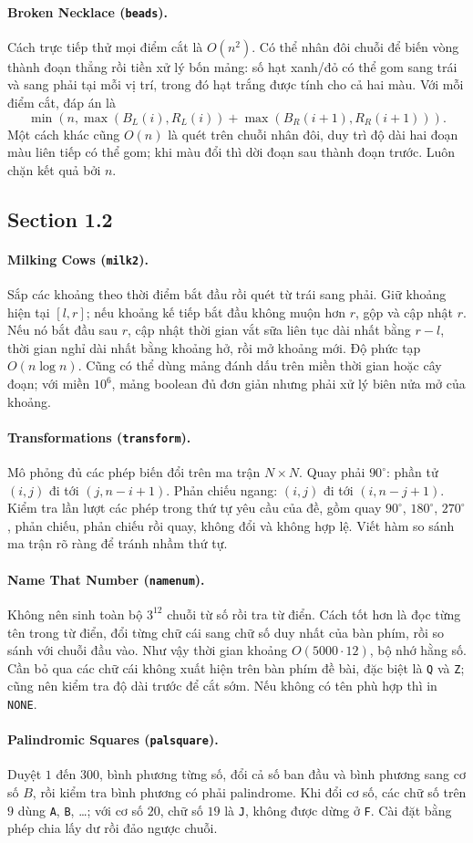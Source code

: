 \documentclass[11pt]{article}
\newcommand{\problem}[2]{\paragraph{#1 (\texttt{#2}).}}
\newcommand{\bigO}[1]{\ensuremath{O(#1)}}
\begin{document}
\problem{Broken Necklace}{beads}
Cách trực tiếp thử mọi điểm cắt là \(\bigO{n^2}\). Có thể nhân đôi chuỗi để biến vòng thành đoạn thẳng rồi tiền xử lý bốn mảng: số hạt xanh/đỏ có thể gom sang trái và sang phải tại mỗi vị trí, trong đó hạt trắng được tính cho cả hai màu. Với mỗi điểm cắt, đáp án là
\[
  \min\left(n,\max(B_L(i),R_L(i))+\max(B_R(i+1),R_R(i+1))\right).
\]
Một cách khác cũng \(\bigO{n}\) là quét trên chuỗi nhân đôi, duy trì độ dài hai đoạn màu liên tiếp có thể gom; khi màu đổi thì dời đoạn sau thành đoạn trước. Luôn chặn kết quả bởi \(n\).

\subsection*{Section 1.2}

\problem{Milking Cows}{milk2}
Sắp các khoảng theo thời điểm bắt đầu rồi quét từ trái sang phải. Giữ khoảng hiện tại \([l,r]\); nếu khoảng kế tiếp bắt đầu không muộn hơn \(r\), gộp và cập nhật \(r\). Nếu nó bắt đầu sau \(r\), cập nhật thời gian vắt sữa liên tục dài nhất bằng \(r-l\), thời gian nghỉ dài nhất bằng khoảng hở, rồi mở khoảng mới. Độ phức tạp \(\bigO{n\log n}\). Cũng có thể dùng mảng đánh dấu trên miền thời gian hoặc cây đoạn; với miền \(10^6\), mảng boolean đủ đơn giản nhưng phải xử lý biên nửa mở của khoảng.

\problem{Transformations}{transform}
Mô phỏng đủ các phép biến đổi trên ma trận \(N\times N\). Quay phải \(90^\circ\): phần tử \((i,j)\) đi tới \((j,n-i+1)\). Phản chiếu ngang: \((i,j)\) đi tới \((i,n-j+1)\). Kiểm tra lần lượt các phép trong thứ tự yêu cầu của đề, gồm quay \(90^\circ\), \(180^\circ\), \(270^\circ\), phản chiếu, phản chiếu rồi quay, không đổi và không hợp lệ. Viết hàm so sánh ma trận rõ ràng để tránh nhầm thứ tự.

\problem{Name That Number}{namenum}
Không nên sinh toàn bộ \(3^{12}\) chuỗi từ số rồi tra từ điển. Cách tốt hơn là đọc từng tên trong từ điển, đổi từng chữ cái sang chữ số duy nhất của bàn phím, rồi so sánh với chuỗi đầu vào. Như vậy thời gian khoảng \(\bigO{5000\cdot 12}\), bộ nhớ hằng số. Cần bỏ qua các chữ cái không xuất hiện trên bàn phím đề bài, đặc biệt là \texttt{Q} và \texttt{Z}; cũng nên kiểm tra độ dài trước để cắt sớm. Nếu không có tên phù hợp thì in \texttt{NONE}.

\problem{Palindromic Squares}{palsquare}
Duyệt \(1\) đến \(300\), bình phương từng số, đổi cả số ban đầu và bình phương sang cơ số \(B\), rồi kiểm tra bình phương có phải palindrome. Khi đổi cơ số, các chữ số trên \(9\) dùng \texttt{A}, \texttt{B}, \ldots; với cơ số \(20\), chữ số \(19\) là \texttt{J}, không được dừng ở \texttt{F}. Cài đặt bằng phép chia lấy dư rồi đảo ngược chuỗi.
\end{document}
